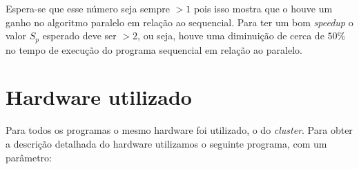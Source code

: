 \documentclass[11pt,twoside]{article}
\begin{document}
    Espera-se que esse número seja sempre $> 1$ pois isso mostra que o houve um ganho
    no algoritmo paralelo em relação ao sequencial. Para ter um bom {\it speedup}
    o valor $S_p$ esperado deve ser $ > 2$, ou seja, houve uma diminuição de cerca de
    $50\%$ no tempo de execução do programa sequencial em relação ao paralelo.

\section{Hardware utilizado}

    Para todos os programas o mesmo hardware foi utilizado, o do \textit{cluster}. Para obter
    a descrição detalhada do hardware utilizamos o seguinte programa, com um parâmetro:
    
    \ \\ \ 
    \ \\
    
\end{document}
